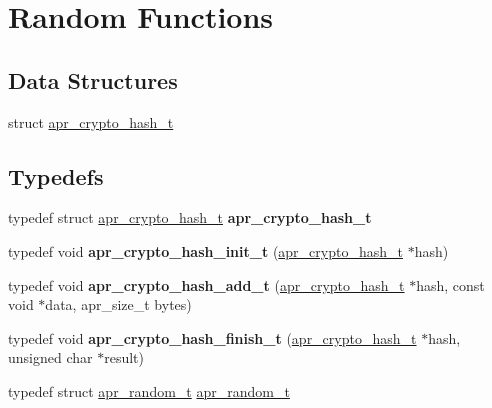 \hypertarget{group__apr__random}{\section{Random Functions}
\label{group__apr__random}
}
\subsection*{Data Structures}
\begin{DoxyCompactItemize}
\item 
struct \hyperlink{structapr__crypto__hash__t}{apr\-\_\-crypto\-\_\-hash\-\_\-t}
\end{DoxyCompactItemize}
\subsection*{Typedefs}
\begin{DoxyCompactItemize}
\item 
\hypertarget{group__apr__random_ga30fbaf80424a9f1a0e9cc51072f65127}{typedef struct \hyperlink{structapr__crypto__hash__t}{apr\-\_\-crypto\-\_\-hash\-\_\-t} {\bfseries apr\-\_\-crypto\-\_\-hash\-\_\-t}}\label{group__apr__random_ga30fbaf80424a9f1a0e9cc51072f65127}

\item 
\hypertarget{group__apr__random_gad2775bc1cdb376d9dec0e97283b4bdd9}{typedef void {\bfseries apr\-\_\-crypto\-\_\-hash\-\_\-init\-\_\-t} (\hyperlink{structapr__crypto__hash__t}{apr\-\_\-crypto\-\_\-hash\-\_\-t} $\ast$hash)}\label{group__apr__random_gad2775bc1cdb376d9dec0e97283b4bdd9}

\item 
\hypertarget{group__apr__random_ga2f8a4fb18078a76357327ea55936c1ea}{typedef void {\bfseries apr\-\_\-crypto\-\_\-hash\-\_\-add\-\_\-t} (\hyperlink{structapr__crypto__hash__t}{apr\-\_\-crypto\-\_\-hash\-\_\-t} $\ast$hash, const void $\ast$data, apr\-\_\-size\-\_\-t bytes)}\label{group__apr__random_ga2f8a4fb18078a76357327ea55936c1ea}

\item 
\hypertarget{group__apr__random_gab70ea9133870efdb5532d20d4bcf7442}{typedef void {\bfseries apr\-\_\-crypto\-\_\-hash\-\_\-finish\-\_\-t} (\hyperlink{structapr__crypto__hash__t}{apr\-\_\-crypto\-\_\-hash\-\_\-t} $\ast$hash, unsigned char $\ast$result)}\label{group__apr__random_gab70ea9133870efdb5532d20d4bcf7442}

\item 
typedef struct \hyperlink{group__apr__random_ga33073741e56b1bafe52ba58cefcbbf96}{apr\-\_\-random\-\_\-t} \hyperlink{group__apr__random_ga33073741e56b1bafe52ba58cefcbbf96}{apr\-\_\-random\-\_\-t}
\end{DoxyCompactItemize}
